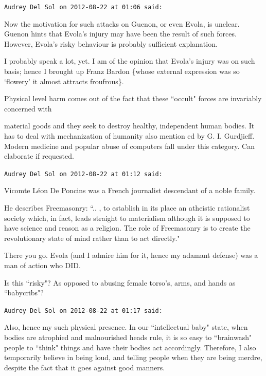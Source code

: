 \begin{footnotesize}\begin{sffamily}



\texttt{Audrey Del Sol on 2012-08-22 at 01:06 said: }

Now the motivation for such attacks on Guenon, or even Evola, is unclear. Guenon hints that Evola's injury may have been the result of such forces. However, Evola's risky behaviour is probably sufficient explanation.

I probably speak a lot, yet. I am of the opinion that Evola's injury was on such basis; hence I brought up Franz Bardon \{whose external expression was so `flowery' it almost attracts froufrous\}.

Physical level harm comes out of the fact that these ``occult" forces are invariably concerned with

material goods and they seek to destroy healthy, independent human bodies. It has to deal with mechanization of humanity also mention ed by G. I. Gurdjieff. Modern medicine and popular abuse of computers fall under this category. Can elaborate if requested.


\hfill

\texttt{Audrey Del Sol on 2012-08-22 at 01:12 said: }

Vicomte Léon De Poncins was a French journalist descendant of a noble family. 

He describes Freemasonry: ``.. , to establish in its place an atheistic rationalist society which, in fact, leads straight to materialism although it is supposed to have science and reason as a religion. The role of Freemasonry is to create the revolutionary state of mind rather than to act directly."

There you go. Evola (and I admire him for it, hence my adamant defense) was a man of action who DID.

Is this ``risky"? As opposed to abusing female torso's, arms, and hands as ``babycribs"?


\hfill

\texttt{Audrey Del Sol on 2012-08-22 at 01:17 said: }

Also, hence my such physical presence. In our ``intellectual baby" state, when bodies are atrophied and malnourished heads rule, it is so easy to ``brainwash" people to ``think" things and have their bodies act accordingly. Therefore, I also temporarily believe in being loud, and telling people when they are being merdre, despite the fact that it goes against good manners.



\end{sffamily}
\end{footnotesize}
